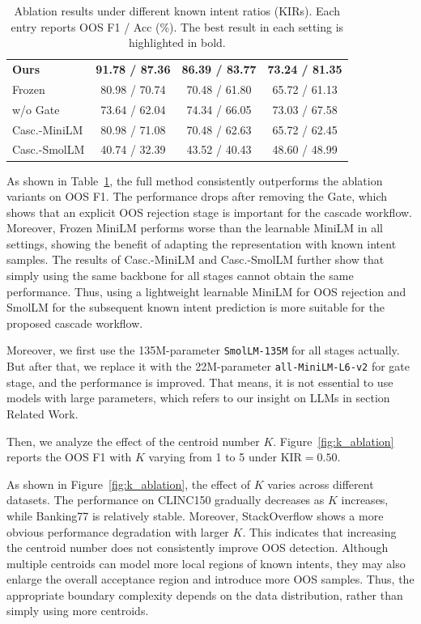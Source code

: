 \documentclass[11pt]{article}
\begin{document}
\begin{table}[t]
\begin{tabular*}{\columnwidth}{
@{\extracolsep{\fill}}
lccc
@{}
}
\textbf{Ours}
& \textbf{91.78 / 87.36}
& \textbf{86.39 / 83.77}
& \textbf{73.24 / 81.35} \\

Frozen
& 80.98 / 70.74
& 70.48 / 61.80
& 65.72 / 61.13 \\

w/o Gate
& 73.64 / 62.04
& 74.34 / 66.05
& 73.03 / 67.58 \\

Casc.-MiniLM
& 80.98 / 71.08
& 70.48 / 62.63
& 65.72 / 62.45 \\

Casc.-SmolLM
& 40.74 / 32.39
& 43.52 / 40.43
& 48.60 / 48.99 \\

\bottomrule
\end{tabular*}

\caption{
Ablation results under different known intent ratios (KIRs).
Each entry reports OOS F1 / Acc (\%).
The best result in each setting is highlighted in bold.
}
\label{tab:ablation_all_kir}
\end{table}

As shown in Table~\ref{tab:ablation_all_kir}, the full method consistently outperforms the ablation variants on OOS F1. The performance drops after removing the Gate, which shows that an explicit OOS rejection stage is important for the cascade workflow. Moreover, Frozen MiniLM performs worse than the learnable MiniLM in all settings, showing the benefit of adapting the representation with known intent samples. The results of Casc.-MiniLM and Casc.-SmolLM further show that simply using the same backbone for all stages cannot obtain the same performance. Thus, using a lightweight learnable MiniLM for OOS rejection and SmolLM for the subsequent known intent prediction is more suitable for the proposed cascade workflow.

Moreover, we first use the 135M-parameter \texttt{SmolLM-135M} for all stages actually. But after that, we replace it with the 22M-parameter \texttt{all-MiniLM-L6-v2} for gate stage, and the performance is improved. That means, it is not essential to use models with large parameters, which refers to our insight on LLMs in section Related Work.

Then, we analyze the effect of the centroid number $K$. Figure~\ref{fig:k_ablation} reports the OOS F1 with $K$ varying from 1 to 5 under KIR$=0.50$.

As shown in Figure~\ref{fig:k_ablation}, the effect of $K$ varies across different datasets. The performance on CLINC150 gradually decreases as $K$ increases, while Banking77 is relatively stable. Moreover, StackOverflow shows a more obvious performance degradation with larger $K$. This indicates that increasing the centroid number does not consistently improve OOS detection. Although multiple centroids can model more local regions of known intents, they may also enlarge the overall acceptance region and introduce more OOS samples. Thus, the appropriate boundary complexity depends on the data distribution, rather than simply using more centroids.
\end{document}
